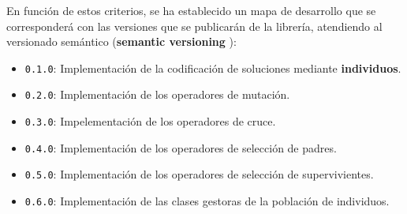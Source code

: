 En función de estos criterios, se ha establecido un mapa de desarrollo que se corresponderá con las versiones que se publicarán de la librería, atendiendo al versionado semántico (\textbf{semantic versioning} \cite{semver}):

\begin{itemize}
    \item \texttt{0.1.0}: Implementación de la codificación de soluciones mediante \textbf{individuos}.
    \item \texttt{0.2.0}: Implementación de los operadores de mutación.
    \item \texttt{0.3.0}: Impelementación de los operadores de cruce.
    \item \texttt{0.4.0}: Implementación de los operadores de selección de padres. 
    \item \texttt{0.5.0}: Implementación de los operadores de selección de supervivientes.
    \item \texttt{0.6.0}: Implementación de las clases gestoras de la población de individuos.
\end{itemize}